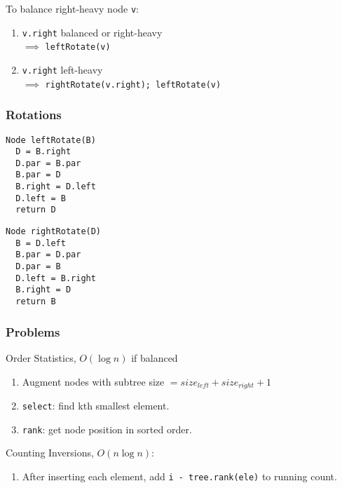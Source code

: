 \documentclass[12pt, a4paper]{article}
\begin{document}
\begin{multicols*}{3}
To balance right-heavy node \lstinline|v|:
\begin{enumerate}[\roman*.]
  \item \lstinline|v.right| balanced or right-heavy\\$\implies$ \lstinline|leftRotate(v)|
  \item \lstinline|v.right| left-heavy\\$\implies$ \lstinline|rightRotate(v.right); leftRotate(v)|
\end{enumerate}

\colbreak
\subsubsection{Rotations}
\begin{minipage}{0.45\columnwidth}
  \begin{lstlisting}
Node leftRotate(B)
  D = B.right
  D.par = B.par
  B.par = D
  B.right = D.left
  D.left = B
  return D
  \end{lstlisting}
\end{minipage}
\begin{minipage}{0.5\columnwidth}
  \begin{lstlisting}
Node rightRotate(D)
  B = D.left
  B.par = D.par
  D.par = B
  D.left = B.right
  B.right = D
  return B
  \end{lstlisting}
\end{minipage}
\vspace{-2em}
\subsubsection{Problems}
\vspace{-0.5em}
Order Statistics, $O(\log n)$ if balanced
\begin{enumerate}[\roman*.]
  \item Augment nodes with subtree size $= size_{left} + size_{right} + 1$
  \item \lstinline|select|: find kth smallest element.
  \item \lstinline|rank|: get node position in sorted order.
\end{enumerate}

Counting Inversions, $O(n\log n)$:
\begin{enumerate}[\roman*.]
  \item After inserting each element, add \lstinline|i - tree.rank(ele)| to running count.
\end{enumerate}


\end{multicols*}
\end{document}
